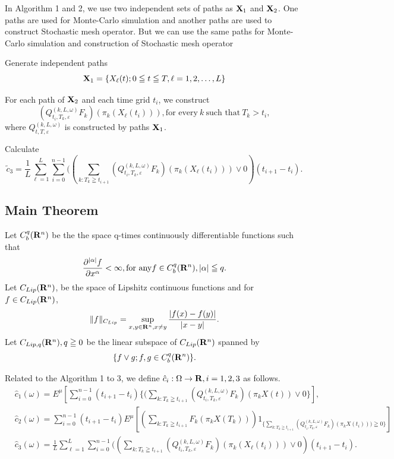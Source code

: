 \documentclass[12pt]{article}
\begin{document}
In Algorithm 1 and 2, we use two independent sets of paths as ${\bf X}_1$ and ${\bf X}_2$.
One paths are used for Monte-Carlo simulation and another paths are used to construct Stochastic mesh operator.
But we can use the same paths for Monte-Carlo simulation and construction  of Stochastic mesh operator \\


\noindent \qquad [Step1] Generate independent paths 
$${\bf X}_1 = \{X_{\ell }(t); 0 \leqq t \leqq T, \ell =1,2,\ldots ,L\}$$

\noindent \qquad[Step2] For each path of ${\bf X}_2$ and each time grid $t_i$, we construct
$$(Q_{t_i,T_k,\varepsilon}^{(k,L,\omega)}F_k)(\pi_k(X_{\ell}(t_i))), \text{for every}\  k \  \text{such that} \ T_k > t_i ,$$
\qquad \qquad \qquad where $Q_{t,T,\varepsilon}^{(k,L,\omega)}$ is constructed by paths ${\bf X}_1$.

\noindent \qquad [Step3] Calculate
$$\tilde{c}_3=\frac{1}{L} \sum_{\ell=1}^L \sum_{i=0}^{n-1} (( \sum_{k:T_k\geqq t_{i+1}} (Q_{t_i,T_k,\varepsilon}^{(k,L,\omega)}F_k)(\pi_k(X_{\ell}(t_i)))\vee0)(t_{i+1}-t_i). $$

\subsection{Main Theorem}
Let  $C^q_b({\bf R}^n)$ be the the space q-times continuously differentiable functions such that
$$\frac{\partial^{|\alpha|}f}{\partial x^{\alpha}} < \infty, \text{for any}  f \in C^q_b({\bf R}^n), |\alpha| \leqq q.$$
Let $C_{Lip}({\bf R}^n)$, be the space of Lipshitz continuous functions and for $f\in C_{Lip}({\bf R}^n)$,
$$\|f\|_{C_{Lip}}=\sup_{x,y\in {\bf R}^n,
x \neq y} \frac{|f(x)-f(y)|}{|x-y|}.$$
Let $C_{Lip,q}({\bf R}^n), q\geqq 0$ be the linear subspace of $C_{Lip}({\bf R}^n)$  spanned by
$$\{f \vee g;  f, g \in C^q_b({\bf R}^n)\}.$$

Related to the Algorithm 1 to 3, we define 
$\hat{c}_i : \Omega \to {\bf R} , i=1,2,3$ as follows.
\begin{align*}
&\hat{c}_1(\omega) =E^{\mu} [ \sum_{i=0}^{n-1}(t_{i+1}-t_{i}) \{(\sum_{k:T_k\geqq t_{i+1}} (Q_{t_i,T_k,\varepsilon}^{(k,L,\omega)}F_k)(\pi_k{X}(t))\vee0\} ],\\
&\hat{c}_2(\omega)=\sum_{i=0}^{n-1}(t_{i+1}-t_{i}) E^{\mu}[( \sum_{k:T_k\geqq t_{i+1}}F_k(\pi_k X(T_k)))
 1_{\{\sum_{k:T_k\geqq t_{i+1}} (Q_{t_i,T_k,\varepsilon}^{(k,L,\omega)}F_k)(\pi_k X(t_i))) \geqq 0\}}]\\
&\hat{c}_3(\omega)=\frac{1}{L} \sum_{\ell=1}^L \sum_{i=0}^{n-1} (( \sum_{k:T_k\geqq t_{i+1}} (Q_{t_i,T_k,\varepsilon}^{(k,L,\omega)}F_k)(\pi_k(X_{\ell}(t_i)))\vee0)(t_{i+1}-t_i).
\end{align*}
\end{document}
